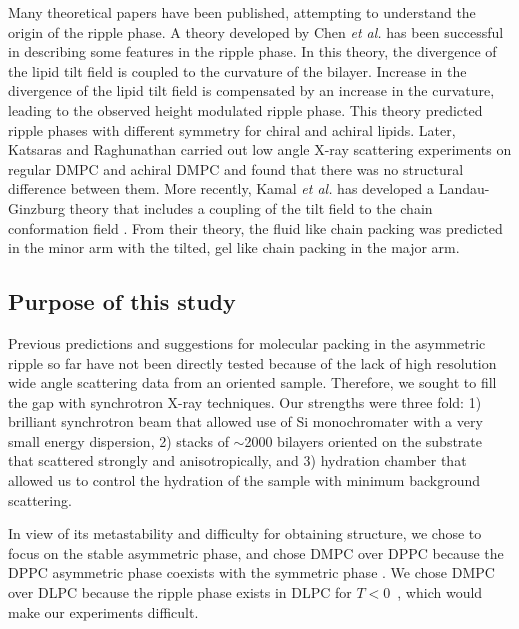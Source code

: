 Many theoretical papers have been published, attempting to understand
the origin of the ripple phase.
A theory developed by Chen \textit{et al.} \cite{ref:Chen95} has been 
successful in describing some features in the ripple phase. In this theory,
the divergence of the lipid tilt field is coupled to the curvature 
of the bilayer. Increase in the divergence of the lipid tilt field is compensated 
by an increase in the curvature, leading to the observed height modulated
ripple phase. This theory predicted ripple phases with different symmetry
for chiral and achiral lipids. Later, Katsaras and Raghunathan 
\cite{ref:Katsaras95} carried out low angle X-ray scattering experiments
on regular DMPC and achiral DMPC and found that there was no structural
difference between them. 
More recently, Kamal \textit{et al.} has developed a Landau-Ginzburg theory
that includes a coupling of the tilt field to the chain conformation field
\cite{ref:Kamal11}.
From their theory, the fluid like chain packing was predicted in the minor
arm with the tilted, gel like chain packing in the major arm.

\subsection{Purpose of this study}
Previous predictions and suggestions for molecular packing in the asymmetric
ripple so far have not been directly tested because of the lack of 
high resolution wide angle scattering data from an oriented sample.
Therefore, we sought to fill the gap
with synchrotron X-ray techniques. Our strengths were three fold: 1) brilliant
synchrotron beam that allowed use of Si monochromater with a very small
energy dispersion, 2) stacks of $\sim$2000 bilayers oriented on the substrate
that scattered strongly and anisotropically, and 3) hydration chamber that 
allowed us to control the hydration of the sample with minimum background scattering.

In view of its metastability and difficulty for obtaining structure,
we chose to focus on the stable asymmetric phase, and chose
DMPC over DPPC because the DPPC asymmetric phase coexists with
the symmetric phase \cite{ref:Katsaras00}.
We chose DMPC over DLPC because the ripple phase exists in DLPC
for $T<0$~\textcelsius, which would make our experiments difficult.

